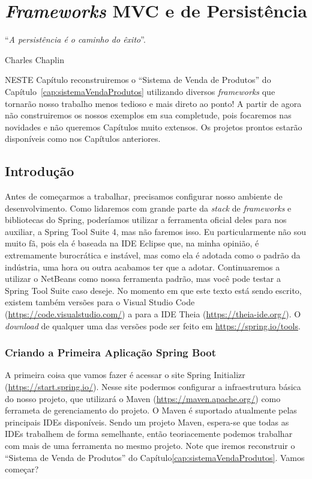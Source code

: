 \chapter{\textit{Frameworks} MVC e de Persistência}\label{cap:frameworksPersistencia}
\epigraph{``\textit{A persistência é o caminho do êxito}''.}{Charles Chaplin}

\lettrine[lines=4, lhang=0.1, lraise=0, loversize=0.2, findent=0.1em]{\textcolor{corTema}{N}}{ESTE} Capítulo reconstruiremos o ``Sistema de Venda de Produtos'' do Capítulo~\ref{cap:sistemaVendaProdutos} utilizando diversos \textit{frameworks} que tornarão nosso trabalho menos tedioso e mais direto ao ponto! A partir de agora não construiremos os nossos exemplos em sua completude, pois focaremos nas novidades e não queremos Capítulos muito extensos. Os projetos prontos estarão disponíveis como nos Capítulos anteriores.

\vfill

\section{Introdução}

Antes de começarmos a trabalhar, precisamos configurar nosso ambiente de desenvolvimento. Como lidaremos com grande parte da \textit{stack} de \textit{frameworks} e bibliotecas do Spring, poderíamos utilizar a ferramenta oficial deles para nos auxiliar, a Spring Tool Suite 4, mas não faremos isso. Eu particularmente não sou muito fã, pois ela é baseada na IDE Eclipse que, na minha opinião, é extremamente burocrática e instável, mas como ela é adotada como o padrão da indústria, uma hora ou outra acabamos ter que a adotar. Continuaremos a utilizar o NetBeans como nossa ferramenta padrão, mas você pode testar a Spring Tool Suite caso deseje. No momento em que este texto está sendo escrito, existem também versões para o Visual Studio Code (\url{https://code.visualstudio.com/}) a para a IDE Theia (\url{https://theia-ide.org/}). O \textit{download} de qualquer uma das versões pode ser feito em \url{https://spring.io/tools}.


\subsection{Criando a Primeira Aplicação Spring Boot}

A primeira coisa que vamos fazer é acessar o site Spring Initializr (\url{https://start.spring.io/}). Nesse site podermos configurar a infraestrutura básica do nosso projeto, que utilizará o Maven (\url{https://maven.apache.org/}) como ferrameta de gerenciamento do projeto. O Maven é suportado atualmente pelas principais IDEs disponíveis. Sendo um projeto Maven, espera-se que todas as IDEs trabalhem de forma semelhante, então teoriacemente podemos trabalhar com mais de uma ferramenta no mesmo projeto. Note que iremos reconstruir o ``Sistema de Venda de Produtos'' do Capítulo\ref{cap:sistemaVendaProdutos}. Vamos começar?

